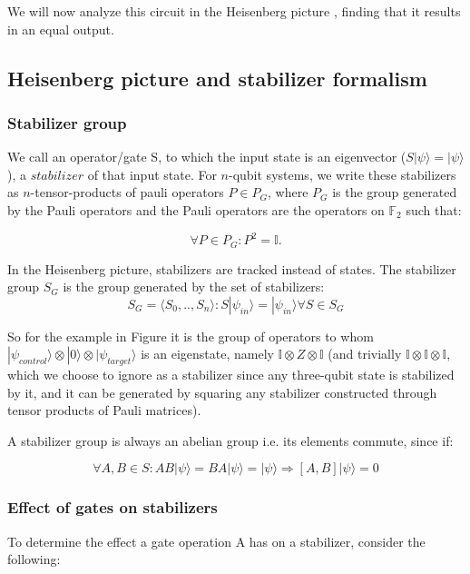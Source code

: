 We will now analyze this circuit in the Heisenberg picture \cite{gottesman},
finding that it results in an equal output.

\subsection{Heisenberg picture and stabilizer formalism}
\subsubsection{Stabilizer group}
We call an operator/gate S, to which the input state is an
eigenvector ($S|\psi\rangle=|\psi\rangle$), a $stabilizer$ of that input state. 
For $n$-qubit systems, we write these stabilizers as $n$-tensor-products 
of pauli operators $P \in P_{G}$,
where $P_{G}$ is the group generated by the Pauli operators and
the Pauli operators are the operators on $\mathbb{F}_{2}$ such that:

\begin{equation}
    \forall P\in P_{G}: P^{2}=\mathbb{I}.
\end{equation}

In the Heisenberg picture, stabilizers are tracked instead of
states. 
The stabilizer group $S_{G}$ is the group generated by
the set of stabilizers:
\begin{equation}
	S_{G} = \langle S_{0},..,S_{n}\rangle: S|\psi_{in}\rangle = 
	|\psi_{in}\rangle \forall S \in S_{G}
\end{equation}

So for the example in Figure%
 it is the group
of operators to whom
$|\psi_{control}\rangle \otimes |0\rangle \otimes 
|\psi_{target}\rangle$ is an eigenstate, namely 
$\mathbb{I}\otimes Z \otimes \mathbb{I}$ (and trivially
$\mathbb{I}\otimes\mathbb{I}\otimes\mathbb{I}$, which we choose
to ignore as a stabilizer since any three-qubit state
is stabilized by it, and it can be generated by squaring any
stabilizer constructed through tensor products of Pauli matrices).

A stabilizer group is always an abelian group i.e. its elements 
 commute, since if:

\begin{equation}
	\label{abelian_stabilizers_equation}
	\forall A,B \in S: AB|\psi\rangle = BA|\psi\rangle = |\psi\rangle
	\Rightarrow [A,B]|\psi\rangle=0
\end{equation}

\subsubsection{Effect of gates on stabilizers}
To determine the effect a gate operation A has on a
stabilizer, consider the following:

